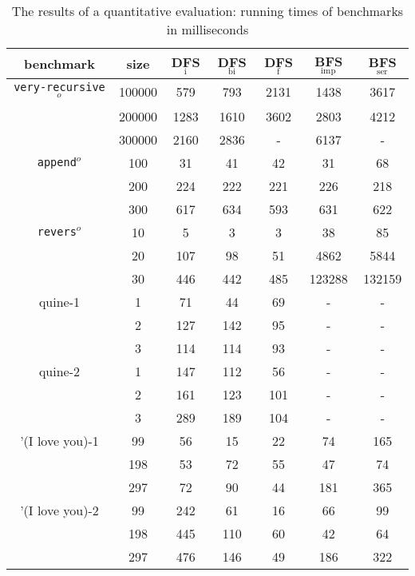 \documentclass[format=acmlarge, review=true, authordraft=true]{acmart}
\newcommand{\veryrecursiveo}{\texttt{very-recursive$^o$}}
\newcommand{\appendo}{\texttt{append$^o$}}
\newcommand{\reverso}{\texttt{revers$^o$}}
\newcommand{\DFSi }[0]{DFS$_\textrm{i}$}
\newcommand{\DFSf }[0]{DFS$_\textrm{f}$}
\newcommand{\DFSbi}[0]{DFS$_\textrm{bi}$}
\newcommand{\BFSser}[0]{BFS$_\textrm{ser}$}
\newcommand{\BFSimp}[0]{BFS$_\textrm{imp}$}
\begin{document}
\begin{table}
	\begin{tabular}{|c|c|c|c|c|c|c|}
		\hline 
		benchmark & size & \DFSi{} & \DFSbi{} & \DFSf{} & 
		\BFSimp{} & \BFSser{}  
		\\
		\hline
		\veryrecursiveo & 100000 &  579 &  793 & 2131 & 1438 & 3617 \\
		& 200000 & 1283 & 1610 & 3602 & 2803 & 4212 \\
		& 300000 & 2160 & 2836 &    - & 6137 &    - \\
		\hline 
		\appendo  & 100 &  31 &  41 &  42 &  31 &  68 \\ 
		& 200 & 224 & 222 & 221 & 226 & 218 \\ 
		& 300 & 617 & 634 & 593 & 631 & 622 \\ 
		\hline 
		\reverso & 10 &   5 &   3 &   3 &     38 &     85 \\ 
		& 20 & 107 &  98 &  51 &   4862 &   5844 \\
		& 30 & 446 & 442 & 485 & 123288 & 132159 \\ 
		\hline
		quine-1 & 1 &  71 &  44 & 69 & - & - \\ 
		& 2 & 127 & 142 & 95 & - & - \\ 
		& 3 & 114 & 114 & 93 & - & - \\ 
		\hline
		quine-2 & 1 & 147 & 112 &  56 & - & - \\ 
		& 2 & 161 & 123 & 101 & - & - \\ 
		& 3 & 289 & 189 & 104 & - & - \\ 
		\hline 
		'(I love you)-1 &  99 & 56 & 15 & 22 &  74 & 165 \\ 
		& 198 & 53 & 72 & 55 &  47 &  74 \\
		& 297 & 72 & 90 & 44 & 181 & 365 \\ 
		\hline
		'(I love you)-2 &  99 & 242 &  61 & 16 &  66 &  99 \\ 
		& 198 & 445 & 110 & 60 &  42 &  64 \\
		& 297 & 476 & 146 & 49 & 186 & 322 \\ 
		\hline 
	\end{tabular}
	\caption{The results of a quantitative evaluation: running times of 
	benchmarks 
		in milliseconds}
	\label{compare-efficiency}
\end{table}
\end{document}
